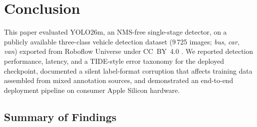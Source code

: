 \section{Conclusion}
\label{sec:conclusion}

This paper evaluated YOLO26m, an NMS-free single-stage detector, on a
publicly available three-class vehicle detection dataset (9\,725 images;
\textit{bus}, \textit{car}, \textit{van}) exported from Roboflow Universe
under CC~BY~4.0 \cite{roboflow_dataset}.
We reported detection performance, latency, and a TIDE-style error
taxonomy for the deployed checkpoint, documented a silent label-format
corruption that affects training data assembled from mixed annotation
sources, and demonstrated an end-to-end deployment pipeline on consumer
Apple Silicon hardware.

\subsection*{Summary of Findings}

